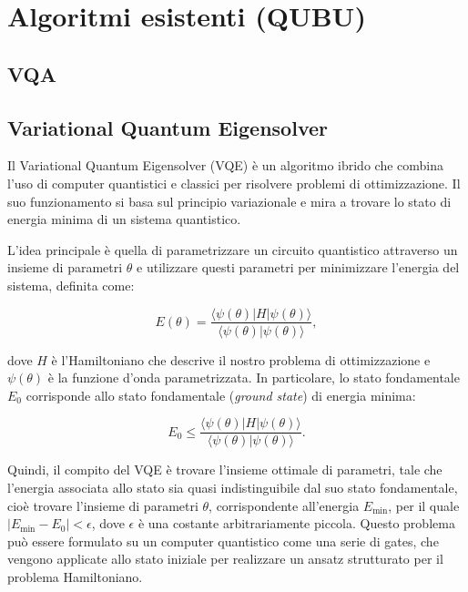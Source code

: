 \section{Algoritmi esistenti (QUBU)}\label{sec:algoritmi}

\subsection{VQA}\label{sec:vqa}




\subsection{Variational Quantum Eigensolver}\label{sec:vqe}

Il Variational Quantum Eigensolver (VQE) è un algoritmo ibrido che combina l'uso di 
computer quantistici e classici per risolvere problemi di ottimizzazione. Il suo 
funzionamento si basa sul principio variazionale e mira a trovare lo stato di energia 
minima di un sistema quantistico.

L'idea principale è quella di parametrizzare un circuito quantistico attraverso un 
insieme di parametri $\theta$ e utilizzare questi parametri per minimizzare l'energia 
del sistema, definita come:

\begin{equation}\label{eqn:energiaSistema}
    E(\theta) = \frac{
                    \langle\psi(\theta)|H|\psi(\theta)\rangle
                }
                {
                    \langle\psi(\theta)|\psi(\theta)\rangle
                },
\end{equation}

dove $H$ è l'Hamiltoniano che descrive il nostro problema di ottimizzazione e 
$\psi(\theta)$ è la funzione d'onda parametrizzata. In particolare, lo stato 
fondamentale $E_0$ corrisponde allo stato fondamentale (\textit{ground state}) 
di energia minima: 

\begin{equation}
    E_0 \le \frac{
                    \langle\psi(\theta)|H|\psi(\theta)\rangle
                }
                {
                    \langle\psi(\theta)|\psi(\theta)\rangle
                }.
\end{equation}

Quindi, il compito del VQE è trovare l'insieme ottimale di parametri, tale che 
l'energia associata allo stato sia quasi indistinguibile dal suo stato fondamentale, 
cioè trovare l'insieme di parametri $\theta$, corrispondente all'energia $E_{\min}$, 
per il quale $|E_{\min} - E_0| < \epsilon$, dove $\epsilon$ è una costante 
arbitrariamente piccola. Questo problema può essere formulato su un computer 
quantistico come una serie di gates, che vengono applicate allo stato iniziale 
per realizzare un ansatz strutturato per il problema Hamiltoniano. 

